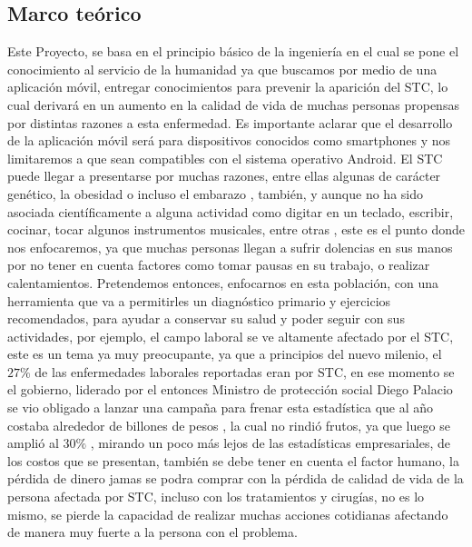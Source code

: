 \documentclass[a4paper,man,natbib]{apa6}
\begin{document}
\subsection{Marco teórico}
Este Proyecto, se basa en el principio básico de la ingeniería en el cual se pone el conocimiento al servicio de la humanidad \cite{f1} ya que buscamos por medio de una aplicación móvil, entregar conocimientos para prevenir la aparición del STC, lo cual derivará en un aumento en la calidad de vida de muchas personas propensas por distintas razones a esta enfermedad. Es importante aclarar que el desarrollo de la aplicación móvil será para dispositivos conocidos como smartphones y nos limitaremos a que sean compatibles con el sistema operativo Android. El STC puede llegar a presentarse por muchas razones,  entre ellas algunas de carácter genético, la obesidad o incluso el embarazo \cite{f2} , también, y aunque no ha sido asociada científicamente a alguna actividad como digitar en un teclado, escribir, cocinar, tocar algunos instrumentos musicales, entre otras \cite{f2}, este es el punto donde nos enfocaremos, ya que muchas personas llegan a sufrir dolencias en sus manos por no tener en cuenta factores como tomar pausas en su trabajo, o realizar calentamientos. Pretendemos entonces, enfocarnos en esta población, con una herramienta que va a permitirles un diagnóstico primario y ejercicios recomendados, para ayudar a conservar su salud y poder seguir con sus actividades, por ejemplo, el campo laboral se ve altamente afectado por el STC, este es un tema ya muy preocupante, ya que a principios del nuevo milenio, el $27\%$  de las enfermedades laborales reportadas eran por STC, en ese momento se el gobierno, liderado por el entonces Ministro de protección social Diego Palacio se vio obligado a lanzar una campaña para frenar esta estadística que al año costaba alrededor de  billones de pesos \cite{f3}, la cual no rindió frutos, ya que luego se amplió al $30\%$ \cite{f2}, mirando un poco más lejos de las estadísticas empresariales, de los costos que se presentan, también se debe tener en cuenta el factor humano, la pérdida de dinero jamas se podra comprar con la pérdida de calidad de vida de la persona afectada por STC, incluso con los tratamientos y cirugías, no es lo mismo, se pierde la capacidad de realizar muchas acciones cotidianas afectando de manera muy fuerte a la persona con el problema.
\end{document}
